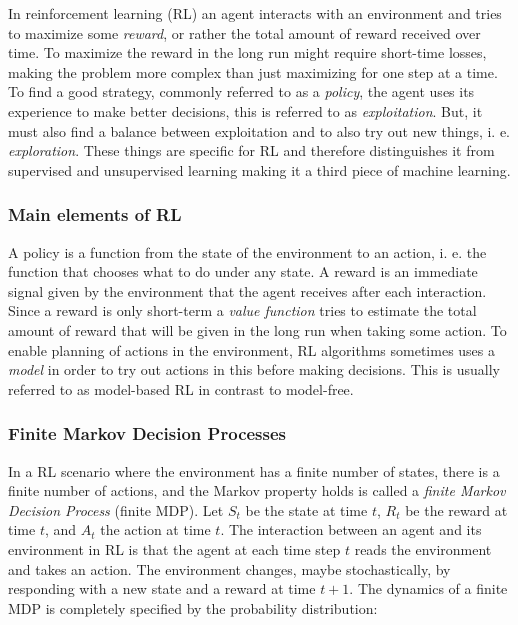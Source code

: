 In reinforcement learning (RL) an agent interacts with an environment and tries
to maximize some \textit{reward}, or rather the total amount of reward received
over time. To maximize the reward in the long run might require short-time
losses, making the problem more complex than just maximizing for one step at a
time.  To find a good strategy, commonly referred to as a \textit{policy}, the
agent uses its experience to make better decisions, this is referred to as
\textit{exploitation}. But, it must also find a balance between exploitation
and to also try out new things, i. e. \textit{exploration}. These things are
specific for RL and therefore distinguishes it from supervised and unsupervised
learning making it a third piece of machine learning.

\subsubsection{Main elements of RL}

A policy is a function from the state of the environment to an action, i. e.
the function that chooses what to do under any state. A reward is an immediate
signal given by the environment that the agent receives after each interaction.
Since a reward is only short-term a \textit{value function} tries to estimate
the total amount of reward that will be given in the long run when taking some
action. To enable planning of actions in the environment, RL algorithms
sometimes uses a \textit{model} in order to try out actions in this before
making decisions. This is usually referred to as model-based RL in contrast to
model-free.

\subsubsection{Finite Markov Decision Processes}

In a RL scenario where the environment has a finite number of states, there is
a finite number of actions, and the Markov property holds is called a
\textit{finite Markov Decision Process} (finite MDP). Let $S_t$ be the state at
time $t$, $R_t$ be the reward at time $t$, and $A_t$ the action at time $t$.
The interaction between an agent and its environment in RL is that the agent at
each time step $t$ reads the environment and takes an action. The environment
changes, maybe stochastically, by responding with a new state and a reward at
time $t+1$. The dynamics of a finite MDP is completely specified by the
probability distribution:

